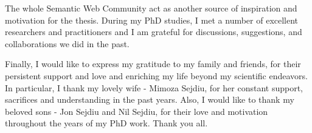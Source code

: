 The whole Semantic Web Community act as another source of inspiration and motivation for the thesis.
During my PhD studies, I met a number of excellent researchers and practitioners and I am grateful for discussions, suggestions, and collaborations we did in the past.

Finally, I would like to express my gratitude to my family and friends, for their persistent support and love and enriching my life beyond my scientific endeavors.
In particular, I thank my lovely wife - Mimoza Sejdiu, for her constant support, sacrifices and understanding in the past years.
Also, I would like to thank my beloved sons - Jon Sejdiu and Nil Sejdiu, for their love and motivation throughout the years of my PhD work.
Thank you all.


\thispagestyle{empty}
{\raggedleft\vfill\itshape{}\par
}
